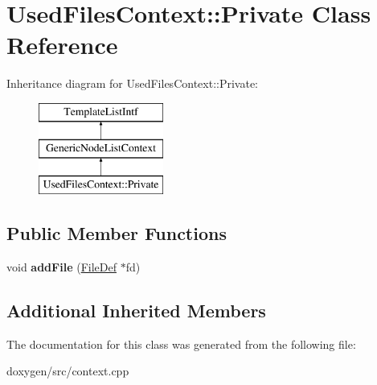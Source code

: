 \hypertarget{class_used_files_context_1_1_private}{}\section{Used\+Files\+Context\+::Private Class Reference}
\label{class_used_files_context_1_1_private}
Inheritance diagram for Used\+Files\+Context\+::Private\+:\begin{figure}[H]
\begin{center}
\leavevmode
\includegraphics[height=3.000000cm]{class_used_files_context_1_1_private}
\end{center}
\end{figure}
\subsection*{Public Member Functions}
\begin{DoxyCompactItemize}
\item 
\mbox{\label{class_used_files_context_1_1_private_a554403c30fcd59689c40cd082f685ce9}} 
void {\bfseries add\+File} (\mbox{\hyperlink{class_file_def}{File\+Def}} $\ast$fd)
\end{DoxyCompactItemize}
\subsection*{Additional Inherited Members}


The documentation for this class was generated from the following file\+:\begin{DoxyCompactItemize}
\item 
doxygen/src/context.\+cpp\end{DoxyCompactItemize}
